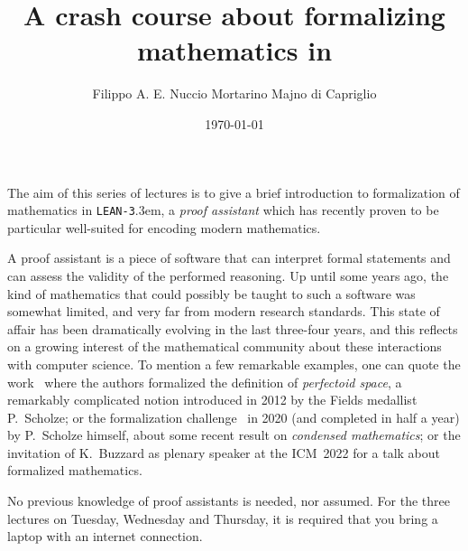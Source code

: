 \documentclass[10pt,francais,a4paper]{amsart}
\title{A crash course about formalizing mathematics in \Lean}
\date{\today}
\author[Filippo A.~E.~Nuccio]{Filippo A. E. Nuccio Mortarino Majno di Capriglio}
\newcommand{\Lean}{\texttt{LEAN-3}\kern.3em}
\begin{document}
\maketitle
\thispagestyle{empty}
The aim of this series of lectures is to give a brief introduction to formalization of mathematics in \Lean, a \emph{proof assistant} which has recently proven to be particular well-suited for encoding modern mathematics.

A proof assistant is a piece of software that can interpret formal statements %
and can assess the validity of the performed reasoning. Up until some years ago, the kind of mathematics that could possibly be taught to such a software was somewhat limited, and very far from modern research standards. This state of affair has been dramatically evolving in the last three-four years, and this reflects on a growing interest of the mathematical community
about these interactions with computer science. To mention a few remarkable examples, one can quote the work~\cite{BuzComMas20} where the authors formalized the definition of \emph{perfectoid space}, a remarkably complicated notion introduced in 2012 by the Fields medallist P.~Scholze; or the formalization challenge~\cite{Sch20} in 2020 (and completed in half a year) by P.~Scholze himself, about some recent result on \emph{condensed mathematics}; or the invitation of K.~Buzzard as plenary speaker at the ICM~2022 for a talk about formalized mathematics.

No previous knowledge of proof assistants is needed, nor assumed. For the three lectures on Tuesday, Wednesday and Thursday, it is required that you bring a laptop with an internet connection.
\end{document}
